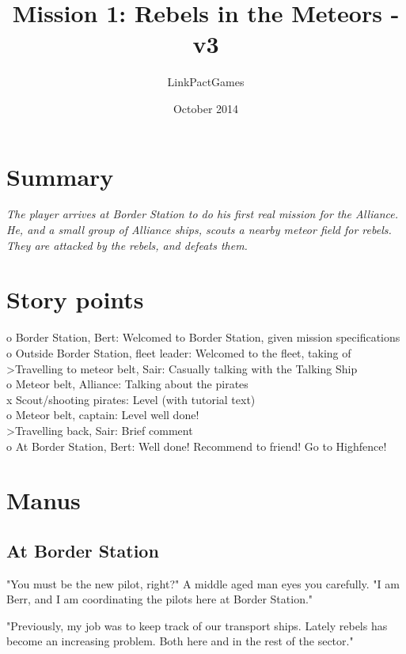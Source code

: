 \documentclass[a4paper,12pt]{article}
\begin{document}
\title{Mission 1: Rebels in the Meteors - v3}
\author{LinkPactGames}
\date{October 2014}
\maketitle

\section{Summary}
\textit{The player arrives at Border Station to do his first real mission
for the Alliance. He, and a small group of Alliance ships, scouts a nearby meteor field
for rebels. They are attacked by the rebels, and defeats them.}

\section{Story points}

o Border Station, Bert: Welcomed to Border Station, given mission specifications\\
o Outside Border Station, fleet leader: Welcomed to the fleet, taking of\\
\textgreater  Travelling to meteor belt, Sair: Casually talking with the Talking Ship\\
o Meteor belt, Alliance: Talking about the pirates\\
x Scout/shooting pirates: Level (with tutorial text)\\
o Meteor belt, captain: Level well done!\\
\textgreater  Travelling back, Sair: Brief comment\\
o At Border Station, Bert: Well done! Recommend to friend! Go to Highfence!

\section{Manus}

\subsection{At Border Station}

"You must be the new pilot, right?" A middle aged man eyes you carefully.
"I am Berr, and I am coordinating the pilots here at Border Station."

"Previously, my job was to keep track of our transport ships. Lately
rebels has become an increasing problem. Both here and in the rest of the sector."
\end{document}
